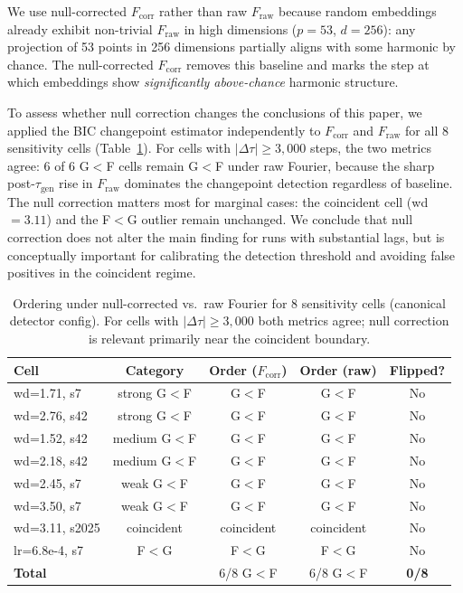 \documentclass{article}
\newcommand{\taug}{\tau_{\mathrm{gen}}}
\newcommand{\Dtau}{\Delta\tau}
\newcommand{\fcorr}{F_{\mathrm{corr}}}
\begin{document}
We use null-corrected $\fcorr$ rather than raw $F_{\mathrm{raw}}$
because random embeddings already exhibit non-trivial $F_{\mathrm{raw}}$
in high dimensions ($p=53$, $d=256$): any projection of 53 points in
256 dimensions partially aligns with some harmonic by chance.
The null-corrected $\fcorr$ removes this baseline and marks the step
at which embeddings show \emph{significantly above-chance} harmonic
structure.

To assess whether null correction changes the conclusions of this paper,
we applied the BIC changepoint estimator independently to $\fcorr$ and
$F_{\mathrm{raw}}$ for all 8 sensitivity cells (Table~\ref{tab:raw_corr}).
For cells with $|\Dtau|\geq3{,}000$ steps, the two metrics agree:
6 of 6 G$<$F cells remain G$<$F under raw Fourier, because the
sharp post-$\taug$ rise in $F_{\mathrm{raw}}$ dominates the changepoint
detection regardless of baseline.
The null correction matters most for marginal cases: the coincident
cell (wd$=3.11$) and the F$<$G outlier remain unchanged.
We conclude that null correction does not alter the main finding
for runs with substantial lags, but is conceptually important for
calibrating the detection threshold and avoiding false positives in
the coincident regime.

\begin{table}[htbp]
\centering
\small
\caption{Ordering under null-corrected vs.\ raw Fourier for 8 sensitivity
  cells (canonical detector config). For cells with $|\Dtau|\geq3{,}000$
  both metrics agree; null correction is relevant primarily near
  the coincident boundary.}
\label{tab:raw_corr}
\begin{tabular}{lcccc}
\toprule
Cell & Category & Order ($\fcorr$) & Order (raw) & Flipped? \\
\midrule
wd=1.71, s7    & strong G$<$F  & G$<$F      & G$<$F      & No \\
wd=2.76, s42   & strong G$<$F  & G$<$F      & G$<$F      & No \\
wd=1.52, s42   & medium G$<$F  & G$<$F      & G$<$F      & No \\
wd=2.18, s42   & medium G$<$F  & G$<$F      & G$<$F      & No \\
wd=2.45, s7    & weak G$<$F    & G$<$F      & G$<$F      & No \\
wd=3.50, s7    & weak G$<$F    & G$<$F      & G$<$F      & No \\
wd=3.11, s2025 & coincident    & coincident & coincident & No \\
lr=6.8e-4, s7  & F$<$G         & F$<$G      & F$<$G      & No \\
\midrule
\textbf{Total} & & 6/8 G$<$F & 6/8 G$<$F & \textbf{0/8} \\
\bottomrule
\end{tabular}
\end{table}
\end{document}

